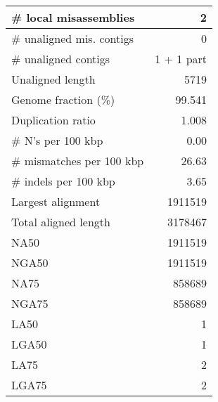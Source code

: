 \documentclass[12pt,a4paper]{article}
\begin{document}
\begin{table}[ht]
\begin{center}
\begin{tabular}{|l*{1}{|r}|}
\# local misassemblies & 2 \\ \hline
\# unaligned mis. contigs & 0 \\ \hline
\# unaligned contigs & 1 + 1 part \\ \hline
Unaligned length & 5719 \\ \hline
Genome fraction (\%) & 99.541 \\ \hline
Duplication ratio & 1.008 \\ \hline
\# N's per 100 kbp & 0.00 \\ \hline
\# mismatches per 100 kbp & 26.63 \\ \hline
\# indels per 100 kbp & 3.65 \\ \hline
Largest alignment & 1911519 \\ \hline
Total aligned length & 3178467 \\ \hline
NA50 & 1911519 \\ \hline
NGA50 & 1911519 \\ \hline
NA75 & 858689 \\ \hline
NGA75 & 858689 \\ \hline
LA50 & 1 \\ \hline
LGA50 & 1 \\ \hline
LA75 & 2 \\ \hline
LGA75 & 2 \\ \hline
\end{tabular}
\end{center}
\end{table}
\end{document}
